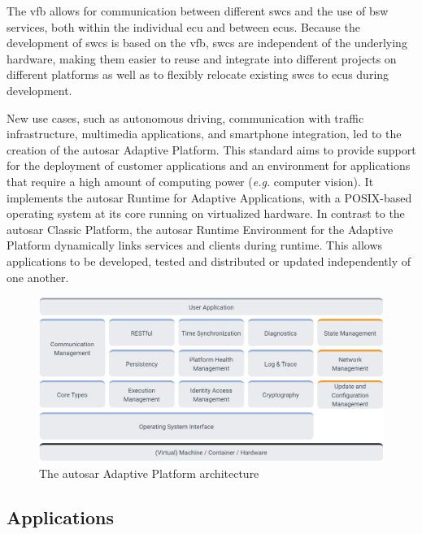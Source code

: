 The \gls{vfb} allows for communication between different \glspl{swc} and the use of \gls{bsw} services, both within the individual \gls{ecu} and between \glspl{ecu}. Because the development of \glspl{swc} is based on the \gls{vfb}, \glspl{swc} are independent of the underlying hardware, making them easier to reuse and integrate into different projects on different platforms as well as to flexibly relocate existing \glspl{swc} to \glspl{ecu} during development.\par

New use cases, such as autonomous driving, communication with traffic infrastructure, multimedia applications, and smartphone integration, led to the creation of the \gls{autosar} Adaptive Platform. This standard aims to provide support for the deployment of customer applications and an environment for applications that require a high amount of computing power (\textit{e.g.} computer vision). It implements the \gls{autosar} Runtime for Adaptive Applications, with a POSIX-based operating system at its core running \citep{autosar_adaptive_os} on virtualized hardware. In contrast to the \gls{autosar} Classic Platform, the \gls{autosar} Runtime Environment for the Adaptive Platform dynamically links services and clients during runtime. This allows applications to be developed, tested and distributed or updated independently of one another.

\begin{figure}
    \centering
    \includegraphics[width = \linewidth]{img/parts/introduction/AUTOSAR Adaptive Platform.png}
    \caption{The \gls{autosar} Adaptive Platform architecture \citep{auosar_adaptive_arch}}
    \label{fig:autosar_adaptive_arch}
\end{figure}

\subsection{Applications}

